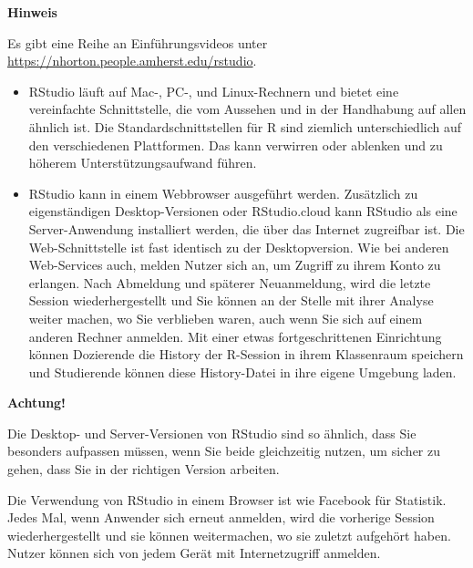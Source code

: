 \documentclass[
  ngerman,
]{scrbook}
\providecommand{\tightlist}{%
  \setlength{\itemsep}{0pt}\setlength{\parskip}{0pt}}
\newenvironment{hinweis}[1]
  {
  \begin{itemize}
  \renewcommand{\labelitemi}{
    \raisebox{1.8\height}[0pt][0pt]{
      {\setkeys{Gin}{width=7em,keepaspectratio}
        {\Large \textcolor{dark-fom-green}\faHandORight}}
        }
  }
  \begin{blackbox}
        \bgroup\color{dark-fom-green}
          {\textbf{Hinweis}}
        \egroup
  \item
  }
  {
  \end{blackbox}
  \end{itemize}
  }
\newenvironment{achtung}[1]
  {
  \begin{itemize}
  \renewcommand{\labelitemi}{
    \raisebox{1.8\height}[0pt][0pt]{
      {\setkeys{Gin}{width=7em,keepaspectratio}
        {\Large \textcolor{dark-fom-green}\faExclamationCircle}}
        }
  }
  \begin{blackbox}
        \bgroup\color{dark-fom-green}
          {\textbf{Achtung!}}
        \egroup
  \item
  }
  {
  \end{blackbox}
  \end{itemize}
  }
\newenvironment{note}[1]
  {
  \begin{itemize}
  \renewcommand{\labelitemi}{
    \raisebox{-.01\height}[0pt][0pt]{
      {\setkeys{Gin}{width=7em,keepaspectratio}
        {\normalsize \textcolor{dark-fom-green}\faHashtag}}
        }
  }
  \begin{blackbox}
   \item
    }
    {
  \end{blackbox}
  \end{itemize}
  }
\begin{document}
\begin{hinweis}{hinweis}
Es gibt eine Reihe an Einführungsvideos unter \url{https://nhorton.people.amherst.edu/rstudio}.

\end{hinweis}

\begin{itemize}
\tightlist
\item
  \textsf{RStudio} läuft auf Mac-, PC-, und Linux-Rechnern und bietet eine vereinfachte Schnittstelle, die vom Aussehen und in der Handhabung auf allen ähnlich ist. Die Standardschnittstellen für \textsf{R} sind ziemlich unterschiedlich auf den verschiedenen Plattformen. Das kann verwirren oder ablenken und zu höherem Unterstützungsaufwand führen.
\item
  \textsf{RStudio} kann in einem Webbrowser ausgeführt werden. Zusätzlich zu eigenständigen Desktop-Versionen oder \textsf{RStudio.cloud} kann \textsf{RStudio} als eine Server-Anwendung installiert werden, die über das Internet zugreifbar ist. Die Web-Schnittstelle ist fast identisch zu der Desktopversion. Wie bei anderen Web-Services auch, melden Nutzer sich an, um Zugriff zu ihrem Konto zu erlangen. Nach Abmeldung und späterer Neuanmeldung, wird die letzte Session wiederhergestellt und Sie können an der Stelle mit ihrer Analyse weiter machen, wo Sie verblieben waren, auch wenn Sie sich auf einem anderen Rechner anmelden. Mit einer etwas fortgeschrittenen Einrichtung können Dozierende die History der \textsf{R}-Session in ihrem Klassenraum speichern und Studierende können diese History-Datei in ihre eigene Umgebung laden.
\end{itemize}

\begin{achtung}{achtung}
Die Desktop- und Server-Versionen von \textsf{RStudio} sind so ähnlich, dass Sie besonders aufpassen müssen, wenn Sie beide gleichzeitig nutzen, um sicher zu gehen, dass Sie in der richtigen Version arbeiten.

\end{achtung}

\begin{note}{note}
Die Verwendung von \textsf{RStudio} in einem Browser ist wie Facebook für Statistik. Jedes Mal, wenn Anwender sich erneut anmelden, wird die vorherige Session wiederhergestellt und sie können weitermachen, wo sie zuletzt aufgehört haben. Nutzer können sich von jedem Gerät mit Internetzugriff anmelden.

\end{note}
\end{document}
